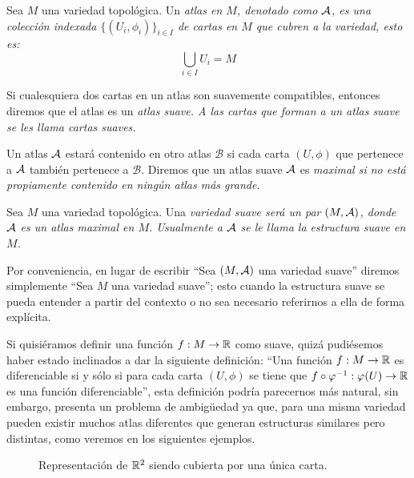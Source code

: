 \begin{definition}\label{Definición: Atlas}
	Sea $M$ una variedad topológica. Un \it{atlas} en $M$, denotado como $\mathcal{A}$, es una colección indexada $\{(U_i,\phi_i)\}_{i\in I}$ de cartas en $M$ que cubren a la variedad, esto es:
	\[\bigcup_{i \in I} U_i = M \]

	Si cualesquiera dos cartas en un atlas son suavemente compatibles, entonces diremos que el atlas es un \it{atlas suave}. A las cartas que forman a un atlas suave se les llama \it{cartas suaves}.

	Un atlas $\mathcal{A}$ estará contenido en otro atlas $\mathcal{B}$ si cada carta $(U,\phi)$ que pertenece a $\mathcal{A}$ también pertenece a $\mathcal{B}$. Diremos que un atlas suave $\mathcal{A}$ es \it{maximal} si no está propiamente contenido en ningún atlas más grande.
\end{definition}

\begin{definition}\label{Definición: Variedad Suave}
	Sea $M$ una variedad topológica. Una \it{variedad suave} será un par $(M, \mathcal{A})$, donde $\mathcal{A}$ es un atlas maximal en $M$. Usualmente a $\mathcal{A}$ se le llama la \it{estructura suave} en $M$.
\end{definition}

Por conveniencia, en lugar de escribir \enquote{Sea $(M,\mathcal{A})$ una variedad suave} diremos simplemente \enquote{Sea $M$ una variedad suave}; esto cuando la estructura suave se pueda entender a partir del contexto o no sea necesario referirnos a ella de forma explícita.


Si quisiéramos definir una función $f: M \to \mathbb{R}$ como suave, quizá pudiésemos haber estado inclinados a dar la siguiente definición: \enquote{Una función $f: M \to \mathbb{R}$ es diferenciable si y sólo si para cada carta $(U,\phi)$ se tiene que $f\circ \varphi^{-1}: \varphi(U) \to \mathbb{R}$ es una función diferenciable}, esta definición podría parecernos más natural, sin embargo, presenta un problema de ambigüedad ya que, para una misma variedad pueden existir muchos atlas diferentes que generan estructuras similares pero distintas, como veremos en los siguientes ejemplos.

\begin{figure}[h]
	\begin{center}
		
		\caption{Representación de $\mathbb{R}^2$ siendo cubierta por una única carta.}
	\end{center}
\end{figure}

